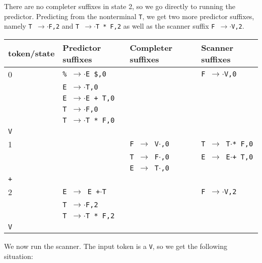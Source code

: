\documentclass[11pt]{article}
\def\ra{\rightarrow}
\begin{document}
There are no completer suffixes in state 2, so we go directly to
running the predictor.  Predicting from the nonterminal \texttt{T}, we
get two more predictor suffixes, namely \texttt{T $\ra$$\cdot$F,2} and
\texttt{T $\ra$$\cdot$T * F,2} as well as the scanner suffix \texttt{F
  $\ra$$\cdot$V,2}. 

\begin{tabular}{|l|l|l|l|}
\hline
token/state & Predictor suffixes & Completer suffixes & Scanner suffixes\\
\hline
0     & \texttt{\% $\ra$$\cdot$E \$,0} & & \texttt{F $\ra$$\cdot$V,0}\\
      & \texttt{E $\ra$$\cdot$T,0} & & \\
      & \texttt{E $\ra$$\cdot$E + T,0} & & \\
      & \texttt{T $\ra$$\cdot$F,0} & & \\
      & \texttt{T $\ra$$\cdot$T * F,0} & & \\
\hline
\texttt{V} &  & &\\
\hline
1     &  & \texttt{F $\ra$ V$\cdot$,0}& \texttt{T $\ra$ T$\cdot$* F,0} \\
      &  & \texttt{T $\ra$ F$\cdot$,0}& \texttt{E $\ra$ E$\cdot$+ T,0} \\
      &  & \texttt{E $\ra$ T$\cdot$,0}& \\
\hline
\texttt{+} &  & &\\
\hline
2     & \texttt{E $\ra$ E +$\cdot$T} & & \texttt{F $\ra$$\cdot$V,2}\\
      & \texttt{T $\ra$$\cdot$F,2} & & \\
      & \texttt{T $\ra$$\cdot$T * F,2} & & \\
\hline 
\texttt{V} &  & &\\
\hline
\end{tabular}


We now run the scanner.  The input token is a \texttt{V}, so we get
the following situation:
\end{document}
